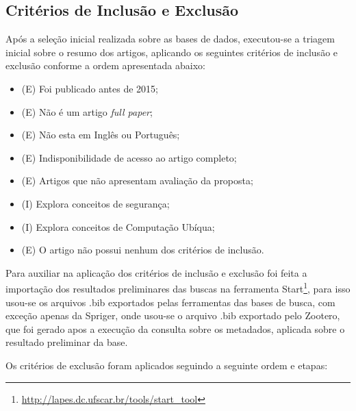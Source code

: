 \documentclass[tid,table]{texufpel} %
\begin{document}
\subsection{Critérios de Inclusão e Exclusão}
Após a seleção inicial realizada sobre as bases de dados, executou-se a triagem inicial sobre o resumo dos artigos, aplicando os seguintes critérios de inclusão e exclusão conforme a ordem apresentada abaixo: 
\begin{itemize}
	\item (E) Foi publicado antes de 2015;
	\item (E) Não é um artigo \textit{full paper};
	\item (E) Não esta em Inglês ou Português;
	\item (E) Indisponibilidade de acesso ao artigo completo;
	\item (E) Artigos que não apresentam avaliação da proposta;
	\item (I) Explora conceitos de segurança;
	\item (I) Explora conceitos de Computação Ubíqua;
	\item (E) O artigo não possui nenhum dos critérios de inclusão.
\end{itemize}
	
Para auxiliar na aplicação dos critérios de inclusão e exclusão foi feita a importação dos resultados preliminares das buscas na ferramenta Start\footnote{\url{http://lapes.dc.ufscar.br/tools/start_tool}},
para isso usou-se os arquivos .bib exportados pelas ferramentas das bases de busca, com exceção apenas da Spriger, onde usou-se o arquivo .bib exportado pelo Zootero, que foi gerado apos a execução da consulta sobre os metadados, aplicada sobre o resultado preliminar da base.

Os critérios de exclusão foram aplicados seguindo a seguinte ordem e etapas:
\end{document}
